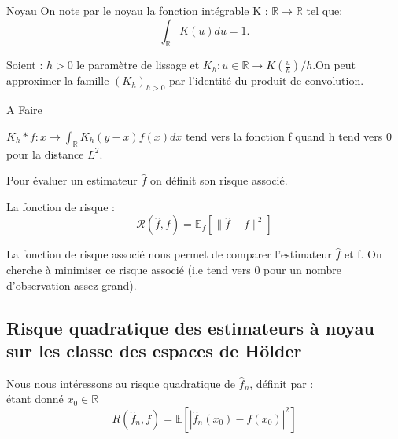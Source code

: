 \documentclass[
]{book}
\begin{document}
\begin{dfn} {Noyau}  \newline
On note par le noyau la fonction intégrable K : $\mathbb{R}\rightarrow\mathbb{R}$ tel que:
$$\int_{\mathbb{R}}K(u)du =1.$$
\end{dfn}

\begin{lem}  
Soient :\newline 
$h>0$ le paramètre de lissage et $K_h : u\in \mathbb{R} \rightarrow K(\frac{u}{h})/h$.On peut approximer la famille $(K_h)_{h>0}$ par l'identité du produit de convolution.
\end{lem}

\begin{demo}
A Faire
\end{demo}

\begin{corol}
$K_h * f : x \rightarrow \int_{\mathbb R} K_h(y-x) f(x) dx$ tend vers la fonction f quand h tend vers 0 pour la distance $L^2$.
\end{corol}

Pour évaluer un estimateur \(\hat{f}\) on définit son risque associé.\newline 

\begin{dfn} 
La fonction de risque : 
$$ 
\mathcal R(\hat f ,f)=\mathbb E_f[\parallel\hat f -f\parallel^2]
$$
\end{dfn}

\begin{rem}
  La fonction de risque associé nous permet de comparer l'estimateur $\hat f$ et  f.\newline
On cherche à minimiser ce risque associé (i.e tend vers 0 pour un nombre d'observation assez grand).\newline
\end{rem}

\hypertarget{risque-quadratique-des-estimateurs-uxe0-noyau-sur-les-classe-des-espaces-de-huxf6lder}{%
\subsection{Risque quadratique des estimateurs à noyau sur les classe des espaces de Hölder}\label{risque-quadratique-des-estimateurs-uxe0-noyau-sur-les-classe-des-espaces-de-huxf6lder}}

Nous nous intéressons au risque quadratique de \(\hat{f}_n\), définit par :\\
étant donné \(x_0 \in \mathbb{R}\)
\[
R(\hat {f}_n, f) = \mathbb{E}[|\hat {f}_n(x_0) - f(x_0)|^2]
\]
\end{document}
